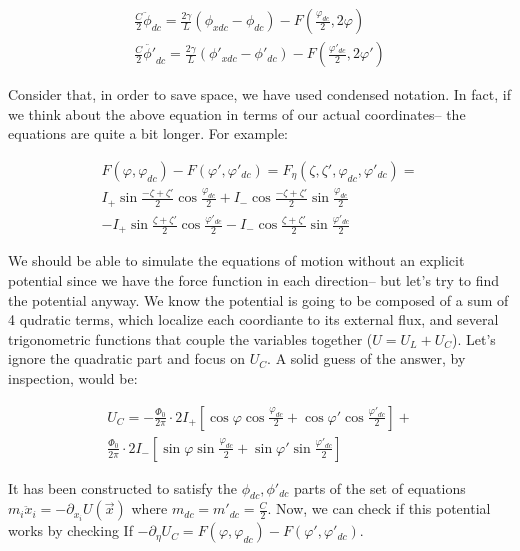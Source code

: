 \documentclass[paper=a4, twocolumn, fontsize=10pt]{article} %
\numberwithin{equation}{section} %
\numberwithin{figure}{section} %
\numberwithin{table}{section} %
\begin{document}
\begin{align}
\frac{C}{2} \ddot{\phi}_{dc} = \frac{2\gamma}{L}\left( \phi_{xdc} -\phi_{dc}\right) -  F(\frac{\varphi_{dc}}{2}, 2\varphi) \\
\frac{C}{2} \ddot{\phi'}_{dc} = \frac{2\gamma}{L}\left( \phi'_{xdc} -\phi'_{dc}\right) -  F(\frac{\varphi'_{dc}}{2}, 2\varphi')
    \end{align}

Consider that, in order to save space, we have used condensed notation. In fact, if we think about the above equation in terms of our actual coordinates-- the equations are quite a bit longer. For example:


\begin{multline}
    F(\varphi, \varphi_{dc}) - F(\varphi', \varphi'_{dc}) = F_{\eta}(\zeta,\zeta',\varphi_{dc},\varphi'_{dc})   =  \\
    I_{+} \sin \frac{-\zeta+\zeta'}{2} \cos \frac{\varphi_{dc}}{2} + I_{-} \cos \frac{-\zeta+\zeta'}{2} \sin \frac{\varphi_{dc}}{2} \\
    - I_{+} \sin \frac{\zeta+\zeta'}{2} \cos \frac{\varphi'_{dc}}{2} - I_{-} \cos \frac{\zeta+\zeta'}{2} \sin \frac{\varphi'_{dc}}{2} 
\end{multline}

We should be able to simulate the equations of motion without an explicit potential since we have the force function in each direction-- but let's try to find the potential anyway. We know the potential is going to be composed of a sum of 4 qudratic terms, which localize each coordiante to its external flux, and several trigonometric functions that couple the variables together ($U=U_L+ U_C$). Let's ignore the quadratic part and focus on $U_C$. A solid guess of the answer, by inspection, would be:

\begin{multline}
U_C = -\frac{\Phi_0}{2\pi}\cdot 2 I_+ \left[ \cos\varphi\cos\frac{\varphi_{dc}}{2} + \cos\varphi'\cos\frac{\varphi'_{dc}}{2} \right] + \\
\frac{\Phi_0}{2\pi}\cdot 2 I_- \left[ \sin\varphi\sin\frac{\varphi_{dc}}{2} + \sin\varphi'\sin\frac{\varphi'_{dc}}{2} \right]
\end{multline}

It has been constructed to satisfy the $\phi_{dc}, \phi'_{dc}$ parts of the set of equations $m_i \ddot{x}_i = -\partial_{x_i} U(\vec{x})$ where $m_{dc} = m'_{dc} = \frac{C}{2} $. Now, we can check if this potential works by checking If $-\partial_\eta U_C = F(\varphi, \varphi_{dc}) - F(\varphi', \varphi'_{dc}) $.
\end{document}
